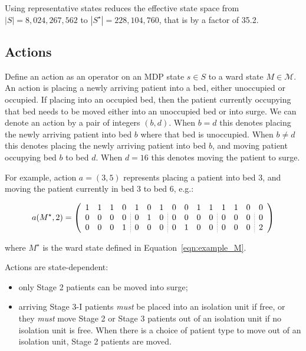 \documentclass{article}
\begin{document}
Using representative states reduces the effective state space from
$|S| = 8,024,267,562$ to $|S^{\star}| = 228,104,760$, that is by a factor of
35.2.

\subsection{Actions}\label{sec:actions}
Define an action as an operator on an MDP state $s \in S$ to a ward state
$M \in \mathcal{M}$.
An action is placing a newly arriving patient into a bed, either unoccupied or
occupied.
If placing into an occupied bed, then the patient currently occupying that bed
needs to be moved either into an unoccupied bed or into surge.
We can denote an action by a pair of integers $(b, d)$.
When $b = d$ this denotes placing the newly arriving patient into bed $b$ where
that bed is unoccupied.
When $b \neq d$ this denotes placing the newly arriving patient into bed $b$,
and moving patient occupying bed $b$ to bed $d$.
When $d = 16$ this denotes moving the patient to surge.

For example, action $a = (3, 5)$ represents placing a patient into bed 3, and
moving the patient currently in bed 3 to bed 6, e.g.:

\begin{equation}\label{eqn:example_action}
a(M^{\star}, 2) = \left(\begin{array}{cccc ;{0.6pt/1.4pt} ccc ;{0.6pt/1.4pt} cccc ;{0.6pt/1.4pt} ccc ;{0.6pt/1.4pt} c}
1 & 1 & 1 & 0 & 1 & 0 & 1 & 0 & 0 & 1 & 1 & 1 & 1 & 0 & 0 \\
0 & 0 & 0 & 0 & 0 & 1 & 0 & 0 & 0 & 0 & 0 & 0 & 0 & 0 & 0 \\
0 & 0 & 0 & 1 & 0 & 0 & 0 & 0 & 1 & 0 & 0 & 0 & 0 & 0 & 2
\end{array}\right)
\end{equation}

where $M^{\star}$ is the ward state defined in Equation~\ref{eqn:example_M}.

Actions are state-dependent:
\begin{itemize}
  \item only Stage 2 patients can be moved into surge;
  \item arriving Stage 3-I patients \textit{must} be placed into an isolation
  unit if free, or they \textit{must} move Stage 2 or Stage 3 patients out of an
  isolation unit if no isolation unit is free. When there is a choice of patient
  type to move out of an isolation unit, Stage 2 patients are moved.
\end{itemize}
\end{document}
